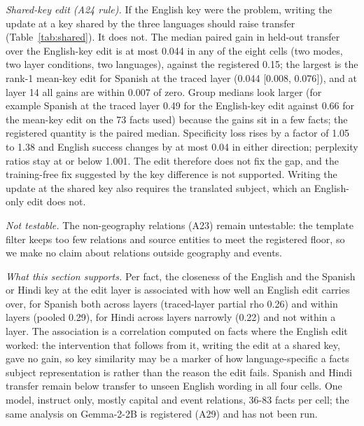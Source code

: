 \documentclass[11pt]{article}
\begin{document}
\emph{Shared-key edit (A24 rule).} If the English key were the problem, writing the update at a key shared by the three languages should raise transfer (Table~\ref{tab:shared}). It does not. The median paired gain in held-out transfer over the English-key edit is at most 0.044 in any of the eight cells (two modes, two layer conditions, two languages), against the registered 0.15; the largest is the rank-1 mean-key edit for Spanish at the traced layer (0.044 {[}0.008, 0.076{]}), and at layer 14 all gains are within 0.007 of zero. Group medians look larger (for example Spanish at the traced layer 0.49 for the English-key edit against 0.66 for the mean-key edit on the 73 facts used) because the gains sit in a few facts; the registered quantity is the paired median. Specificity loss rises by a factor of 1.05 to 1.38 and English success changes by at most 0.04 in either direction; perplexity ratios stay at or below 1.001. The edit therefore does not fix the gap, and the training-free fix suggested by the key difference is not supported. Writing the update at the shared key also requires the translated subject, which an English-only edit does not.

\emph{Not testable.} The non-geography relations (A23) remain untestable: the template filter keeps too few relations and source entities to meet the registered floor, so we make no claim about relations outside geography and events.

\emph{What this section supports.} Per fact, the closeness of the English and the Spanish or Hindi key at the edit layer is associated with how well an English edit carries over, for Spanish both across layers (traced-layer partial rho 0.26) and within layers (pooled 0.29), for Hindi across layers narrowly (0.22) and not within a layer. The association is a correlation computed on facts where the English edit worked: the intervention that follows from it, writing the edit at a shared key, gave no gain, so key similarity may be a marker of how language-specific a fact\textquotesingle s subject representation is rather than the reason the edit fails. Spanish and Hindi transfer remain below transfer to unseen English wording in all four cells. One model, instruct only, mostly capital and event relations, 36-83 facts per cell; the same analysis on Gemma-2-2B is registered (A29) and has not been run.
\end{document}
